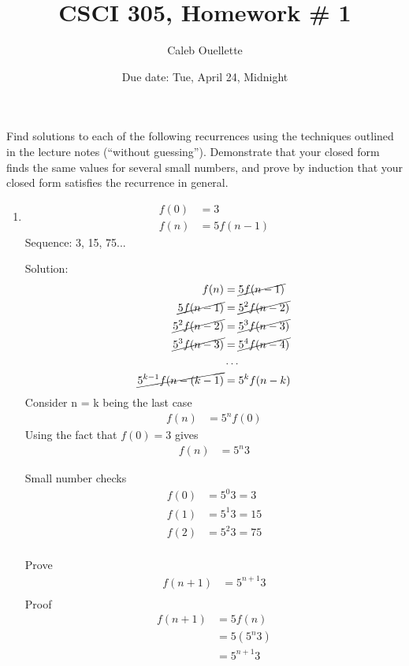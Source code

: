 \documentclass{article}
\title{CSCI 305, Homework \# 1}
\author{Caleb Ouellette}
\date{Due date: Tue, April 24, Midnight}
\begin{document}
\maketitle

Find solutions to each of the following recurrences
using the techniques outlined in the lecture notes (``without guessing'').
Demonstrate that your closed form finds the same values for several
small numbers, and prove by induction that your closed form satisfies
the recurrence in general.

\begin{enumerate}
\item
  \begin{align*}
    f(0) &= 3\\
    f(n) &= 5f(n-1)
  \end{align*}
  Sequence:
  3, 15, 75...

  Solution:
  \begin{align*}
    f(n) &= \cancel{5f(n-1)}\\
    \cancel{5f(n-1)} &= \cancel{5^2f(n-2)}\\
    \cancel{5^2f(n-2)} &= \cancel{5^3f(n-3)}\\
    \cancel{5^3f(n-3)} &= \cancel{5^4f(n-4)}\\
    &\ldots\\
    \cancel{5^{k-1}f(n-(k-1)} &= 5^{k}f(n-k)
  \end{align*}
    Consider n = k being the last case
  \begin{align*}
    f(n) &= 5^{n}f(0)
  \end{align*}
  Using the fact that $f(0)=3$ gives 
  \begin{align*}
    f(n) &= 5^{n}3
  \end{align*}

  Small number checks
  \begin{align*}
    f(0) &= 5^{0}3 = 3\\
    f(1) &= 5^{1}3 = 15\\
    f(2) &= 5^{2}3 = 75\\
  \end{align*}


  Prove
  \begin{align*}
    f(n + 1) &= 5^{n + 1}3 \\
  \end{align*}    
  Proof
  \begin{align*}
    f(n + 1) &= 5f(n) \\    
    &= 5(5^n3) \\
    &= 5^{n + 1}3 \\
  \end{align*}



\end{enumerate}
\end{document}
